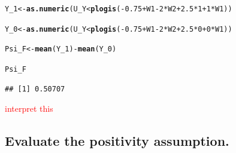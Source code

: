 \documentclass{article}\usepackage[]{graphicx}\usepackage[]{xcolor}
\makeatletter
\newcommand{\hlnum}[1]{\textcolor[rgb]{0.686,0.059,0.569}{#1}}%
\newcommand{\hlopt}[1]{\textcolor[rgb]{0,0,0}{#1}}%
\newcommand{\hlstd}[1]{\textcolor[rgb]{0.345,0.345,0.345}{#1}}%
\newcommand{\hlkwb}[1]{\textcolor[rgb]{0.69,0.353,0.396}{#1}}%
\newcommand{\hlkwd}[1]{\textcolor[rgb]{0.737,0.353,0.396}{\textbf{#1}}}%
\newenvironment{kframe}{%
 \def\at@end@of@kframe{}%
 \ifinner\ifhmode%
  \def\at@end@of@kframe{\end{minipage}}%
  \begin{minipage}{\columnwidth}%
 \fi\fi%
 \def\FrameCommand##1{\hskip\@totalleftmargin \hskip-\fboxsep
 \colorbox{shadecolor}{##1}\hskip-\fboxsep
     \hskip-\linewidth \hskip-\@totalleftmargin \hskip\columnwidth}%
 \MakeFramed {\advance\hsize-\width
   \@totalleftmargin\z@ \linewidth\hsize
   \@setminipage}}%
 {\par\unskip\endMakeFramed%
 \at@end@of@kframe}
\newenvironment{knitrout}{}{} %
\makeatother
\begin{document}
\begin{knitrout}
\color{fgcolor}\begin{kframe}
\begin{alltt}
\hlstd{Y_1} \hlkwb{<-} \hlkwd{as.numeric}\hlstd{(U_Y} \hlopt{<} \hlkwd{plogis}\hlstd{(}\hlopt{-}\hlnum{0.75}\hlopt{+}\hlstd{W1}\hlopt{-}\hlnum{2}\hlopt{*}\hlstd{W2}\hlopt{+}\hlnum{2.5}\hlopt{*}\hlnum{1}\hlopt{+}\hlnum{1}\hlopt{*}\hlstd{W1))}

\hlstd{Y_0} \hlkwb{<-} \hlkwd{as.numeric}\hlstd{(U_Y} \hlopt{<} \hlkwd{plogis}\hlstd{(}\hlopt{-}\hlnum{0.75}\hlopt{+}\hlstd{W1}\hlopt{-}\hlnum{2}\hlopt{*}\hlstd{W2}\hlopt{+}\hlnum{2.5}\hlopt{*}\hlnum{0}\hlopt{+}\hlnum{0}\hlopt{*}\hlstd{W1))}

\hlstd{Psi_F} \hlkwb{<-} \hlkwd{mean}\hlstd{(Y_1)} \hlopt{-} \hlkwd{mean}\hlstd{(Y_0)}

\hlstd{Psi_F}
\end{alltt}
\begin{verbatim}
## [1] 0.50707
\end{verbatim}
\end{kframe}
\end{knitrout}
 
\textcolor{red}{interpret this}
  
  \subsection{Evaluate the positivity assumption.}
  
\end{document}
